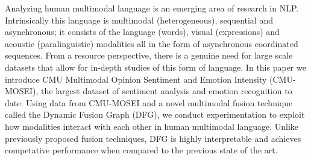 Analyzing human multimodal language is an emerging area of research in NLP. Intrinsically this language is multimodal (heterogeneous), sequential and asynchronous; it consists of the language (words), visual (expressions) and acoustic (paralinguistic) modalities all in the form of asynchronous coordinated sequences. From a resource perspective, there is a genuine need for large scale datasets that allow for in-depth studies of this form of language. In this paper we introduce CMU Multimodal Opinion Sentiment and Emotion Intensity (CMU-MOSEI), the largest dataset of sentiment analysis and emotion recognition to date. Using data from CMU-MOSEI and a novel multimodal fusion technique called the Dynamic Fusion Graph (DFG), we conduct experimentation to exploit how modalities interact with each other in human multimodal language. Unlike previously proposed fusion techniques, DFG is highly interpretable and achieves competative performance when compared to the previous state of the art.
